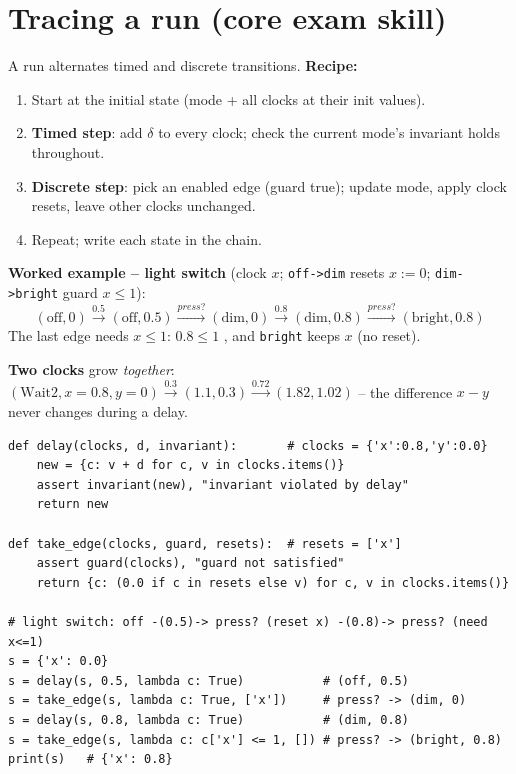 \section{Tracing a run (core exam skill)}
A run alternates timed and discrete transitions. \textbf{Recipe:}
\begin{enumerate}
\item Start at the initial state (mode + all clocks at their init values).
\item \textbf{Timed step}: add $\delta$ to every clock; check the current mode's invariant holds throughout.
\item \textbf{Discrete step}: pick an enabled edge (guard true); update mode, apply clock resets, leave other clocks unchanged.
\item Repeat; write each state in the chain.
\end{enumerate}
\textbf{Worked example -- light switch} (clock $x$; \texttt{off->dim} resets $x{:=}0$; \texttt{dim->bright} guard $x\le1$):
\[
(\text{off},0)\xrightarrow{0.5}(\text{off},0.5)\xrightarrow{press?}(\text{dim},0)\xrightarrow{0.8}(\text{dim},0.8)\xrightarrow{press?}(\text{bright},0.8)
\]
The last edge needs $x\le1$: $0.8\le1$ \checkmark, and \texttt{bright} keeps $x$ (no reset).

\textbf{Two clocks} grow \emph{together}: $(\text{Wait2},x{=}0.8,y{=}0)\xrightarrow{0.3}(1.1,0.3)\xrightarrow{0.72}(1.82,1.02)$ -- the difference $x-y$ never changes during a delay.

\begin{lstlisting}
def delay(clocks, d, invariant):       # clocks = {'x':0.8,'y':0.0}
    new = {c: v + d for c, v in clocks.items()}
    assert invariant(new), "invariant violated by delay"
    return new

def take_edge(clocks, guard, resets):  # resets = ['x']
    assert guard(clocks), "guard not satisfied"
    return {c: (0.0 if c in resets else v) for c, v in clocks.items()}

# light switch: off -(0.5)-> press? (reset x) -(0.8)-> press? (need x<=1)
s = {'x': 0.0}
s = delay(s, 0.5, lambda c: True)           # (off, 0.5)
s = take_edge(s, lambda c: True, ['x'])     # press? -> (dim, 0)
s = delay(s, 0.8, lambda c: True)           # (dim, 0.8)
s = take_edge(s, lambda c: c['x'] <= 1, []) # press? -> (bright, 0.8)
print(s)   # {'x': 0.8}
\end{lstlisting}

